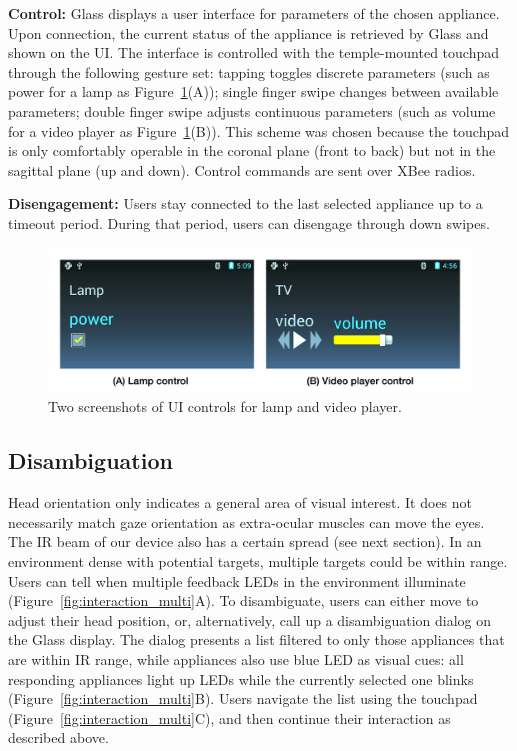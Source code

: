 {\bf Control:} Glass displays a user interface for parameters of the chosen appliance. Upon connection, the current status of the appliance is retrieved by Glass and shown on the UI. The interface is controlled with the temple-mounted touchpad through the following gesture set: tapping toggles discrete parameters (such as power for a lamp as Figure~\ref{fig:ui_controls}(A)); single finger swipe changes between available parameters; double finger swipe adjusts continuous parameters (such as volume for a video player as Figure~\ref{fig:ui_controls}(B)). This scheme was chosen because the touchpad is only comfortably operable in the coronal plane (front to back) but not in the sagittal plane (up and down). 
Control commands are sent over XBee radios.

{\bf Disengagement:} Users stay connected to the last selected appliance up to a timeout period. During that period, users can disengage through down swipes.

\begin{figure}[t!]
\centering
\includegraphics[width=\columnwidth]{figures/ui_controls_caption.jpg}
\caption{Two screenshots of UI controls for lamp and video player.}
\label{fig:ui_controls}
\end{figure}

\subsection{Disambiguation}
Head orientation only indicates a general area of visual interest. It does not necessarily match gaze orientation as extra-ocular muscles can move the eyes. The IR beam of our device also has a certain spread (see next section). In an environment dense with potential targets, multiple targets could be within range. Users can tell when multiple feedback LEDs in the environment illuminate (Figure~\ref{fig:interaction_multi}A). To disambiguate, users can either move to adjust their head position, or, alternatively, call up a disambiguation dialog on the Glass display. The dialog presents a list filtered to only those appliances that are within IR range, while appliances also use blue LED as visual cues: all responding appliances light up LEDs while the currently selected one blinks (Figure~\ref{fig:interaction_multi}B). Users navigate the list using the touchpad (Figure~\ref{fig:interaction_multi}C), and then continue their interaction as described above.
